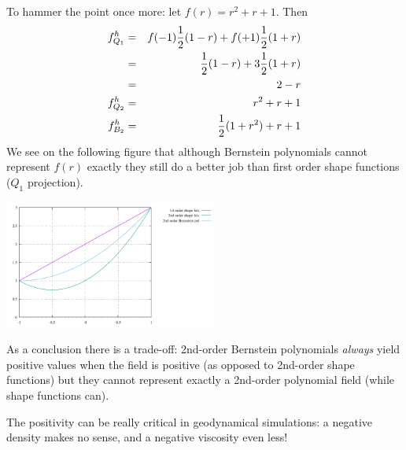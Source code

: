 To hammer the point once more: let $f(r)=r^2+r+1$.
Then 
\begin{eqnarray}
f^h_{Q_1} 
&=& f(-1) \frac{1}{2}(1-r) + f(+1) \frac{1}{2}(1+r) \nonumber\\
&=&  \frac{1}{2}(1-r) + 3 \frac{1}{2}(1+r) \nonumber\\
&=& 2-r \\
f^h_{Q_2} &=& r^2+r+1 \\
f^h_{B_2} &=& \frac{1}{2} (1+r^2)+r+1 
\end{eqnarray}
We see on the following figure that although Bernstein polynomials cannot 
represent $f(r)$ exactly they still do a better job than first order shape functions
($Q_1$ projection).
\begin{center}
\includegraphics[width=7cm]{images/bernstein/hammer.pdf}
\end{center}

As a conclusion there is a trade-off: 2nd-order Bernstein polynomials {\it always} yield positive 
values when the field is positive (as opposed to 2nd-order shape functions) but they cannot 
represent exactly a 2nd-order polynomial field (while shape functions can).

The positivity can be really critical in geodynamical simulations: a negative density makes no sense, 
and a negative viscosity even less!

